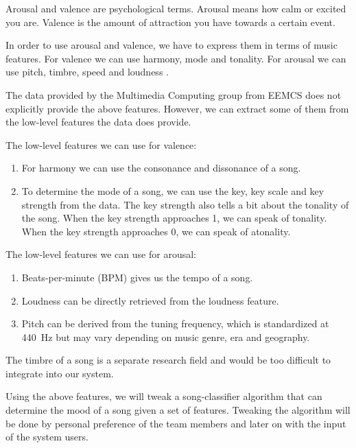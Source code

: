 \documentclass[10pt,a4paper]{article}
\begin{document}
Arousal and valence are psychological terms.
Arousal means how calm or excited you are.
Valence is the amount of attraction you have towards a certain event.

In order to use arousal and valence, we have to express them in terms of music features.
For valence we can use harmony, mode and tonality.
For arousal we can use pitch, timbre, speed and loudness \cite{PresentationMER}\cite{PaperME}.

\newpage

The data provided by the Multimedia Computing group from EEMCS does not explicitly provide the above features.
However, we can extract some of them from the low-level features the data does provide.

The low-level features we can use for valence:
\begin{enumerate}
\item For harmony we can use the consonance and dissonance of a song.
\item To determine the mode of a song, we can use the key, key scale and key strength from the data.
The key strength also tells a bit about the tonality of the song.
When the key strength approaches 1, we can speak of tonality. When the key strength approaches 0, we can speak of atonality.
\end{enumerate}
The low-level features we can use for arousal:
\begin{enumerate}
\item Beats-per-minute (BPM) gives us the tempo of a song.
\item Loudness can be directly retrieved from the loudness feature.
\item Pitch can be derived from the tuning frequency, which is standardized at \SI{440}{\hertz} but may vary depending on music genre, era and geography.
\end{enumerate}

The timbre of a song is a separate research field and would be too difficult to integrate into our system.

Using the above features, we will tweak a song-classifier algorithm that can determine the mood of a song given a set of features.
Tweaking the algorithm will be done by personal preference of the team members and later on with the input of the system users.

%
%
{}

\end{document}
